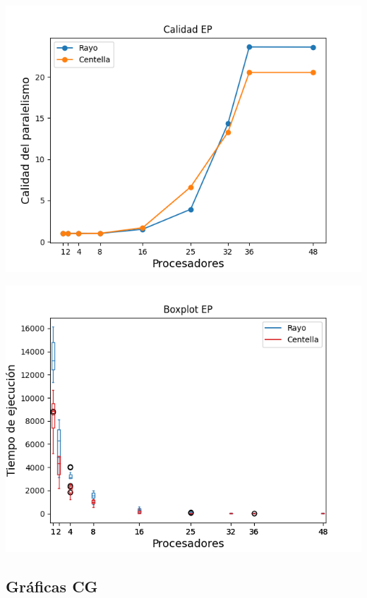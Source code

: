 \begin{center}
 \centering
 \begin{minipage}[b]{.49\textwidth}
  \includegraphics[width=1\linewidth]{plots/calidad-ep.png}
 \end{minipage}
 \begin{minipage}[b]{.49\textwidth}
  \includegraphics[width=1\linewidth]{plots/boxplot-ep.png}
 \end{minipage}
\end{center}

\newpage

\subsection{Gráficas CG}

